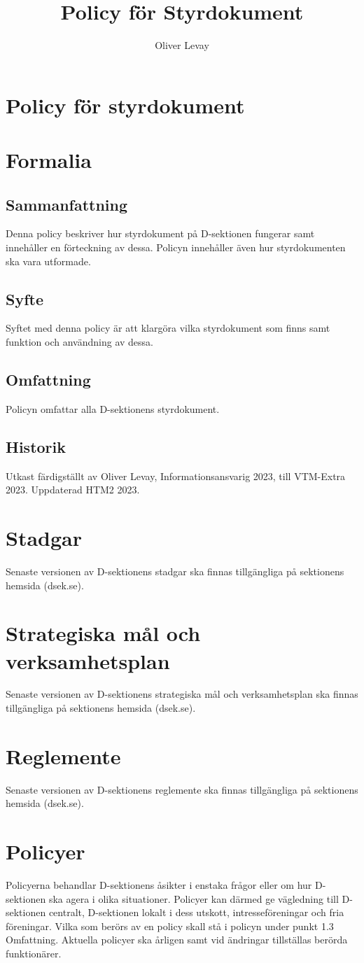 \documentclass[]{dsekprotokoll}
\title{Policy för Styrdokument}
\author{Oliver Levay}
\begin{document}
\section*{Policy för styrdokument}
\section{Formalia}
\subsection{Sammanfattning}
Denna policy beskriver hur styrdokument på D-sektionen fungerar samt innehåller en förteckning av dessa. Policyn innehåller även hur styrdokumenten ska vara utformade.
\subsection{Syfte}
Syftet med denna policy är att klargöra vilka styrdokument som finns samt funktion och användning av dessa.
\subsection{Omfattning}
Policyn omfattar alla D-sektionens styrdokument.

\subsection{Historik}
Utkast färdigställt av Oliver Levay, Informationsansvarig 2023, till VTM-Extra 2023. Uppdaterad HTM2 2023.
\section{Stadgar}
Senaste versionen av D-sektionens stadgar ska finnas tillgängliga på sektionens hemsida (dsek.se).

\section{Strategiska mål och verksamhetsplan}
Senaste versionen av D-sektionens strategiska mål och verksamhetsplan ska finnas tillgängliga på sektionens hemsida (dsek.se).

\section{Reglemente}
Senaste versionen av D-sektionens reglemente ska finnas tillgängliga på sektionens hemsida (dsek.se).

\section{Policyer}
Policyerna behandlar D-sektionens åsikter i enstaka frågor eller om hur D-sektionen ska agera i olika situationer. Policyer kan därmed ge vägledning till D-sektionen centralt, D-sektionen lokalt i dess
utskott, intresseföreningar och fria föreningar. Vilka som berörs av en policy skall stå i policyn under punkt 1.3 Omfattning. Aktuella policyer ska årligen samt vid ändringar tillställas berörda funktionärer.
\end{document}
